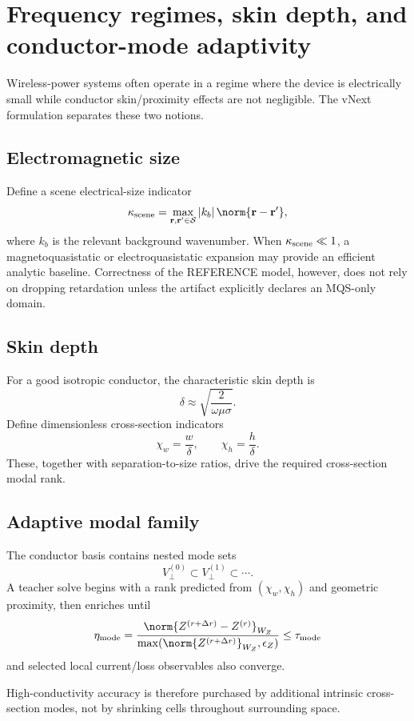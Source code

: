 \section{Frequency regimes, skin depth, and conductor-mode adaptivity}
\label{sec:frequency-regimes}

Wireless-power systems often operate in a regime where the device is
electrically small while conductor skin/proximity effects are not negligible.
The vNext formulation separates these two notions.

\subsection{Electromagnetic size}

Define a scene electrical-size indicator
\[
 \kappa_{\rm scene}
 =
 \max_{\mathbf r,\mathbf r'\in\mathcal S}
 |k_b|\,\norm{\mathbf r-\mathbf r'} ,
\]
where $k_b$ is the relevant background wavenumber. When
$\kappa_{\rm scene}\ll1$, a magnetoquasistatic or electroquasistatic expansion
may provide an efficient analytic baseline. Correctness of the REFERENCE model,
however, does not rely on dropping retardation unless the artifact explicitly
declares an MQS-only domain.

\subsection{Skin depth}

For a good isotropic conductor, the characteristic skin depth is
\[
 \delta
 \approx
 \sqrt{\frac{2}{\omega\mu\sigma}}.
\]
Define dimensionless cross-section indicators
\[
 \chi_w=\frac{w}{\delta},\qquad
 \chi_h=\frac{h}{\delta}.
\]
These, together with separation-to-size ratios, drive the required
cross-section modal rank.

\subsection{Adaptive modal family}

The conductor basis contains nested mode sets
\[
 V_\perp^{(0)}
 \subset V_\perp^{(1)}
 \subset\cdots .
\]
A teacher solve begins with a rank predicted from
$(\chi_w,\chi_h)$ and geometric proximity, then enriches until
\[
 \eta_{\rm mode}
 =
 \frac{\norm{Z^{(r+\Delta r)}-Z^{(r)}}_{W_Z}}
      {\max(\norm{Z^{(r+\Delta r)}}_{W_Z},\epsilon_Z)}
 \le\tau_{\rm mode}
\]
and selected local current/loss observables also converge.

High-conductivity accuracy is therefore purchased by additional intrinsic
cross-section modes, not by shrinking cells throughout surrounding space.


